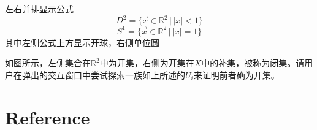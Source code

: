 \documentclass[10pt]{article}
\begin{document}
\begin{tcolorbox}[colback=yellow]
左右并排显示公式
$$D^2=\{\vec{x}\in\mathbb{R}^2\,\big|\,|x|<1\}$$
$$S^1=\{\vec{x}\in\mathbb{R}^2\,\big|\,|x|=1\}$$
其中左侧公式上方显示开球，右侧单位圆
\end{tcolorbox}

如图所示，左侧集合在$\mathbb{R}^2$中为开集，右侧为开集在$X$中的补集，被称为闭集。请用户在弹出的交互窗口中尝试探索一族如上所述的$U_i$来证明前者确为开集。

\section*{Reference}
\printbibliography
\end{document}
